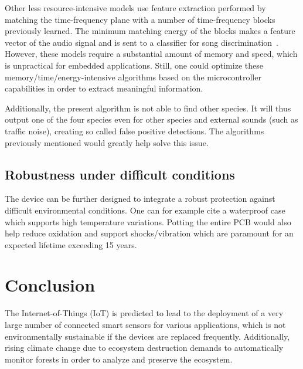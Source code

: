 \documentclass{EPL-master-thesis-covers-EN}
\begin{document}
Other less resource-intensive models use feature extraction performed by matching the time-frequency plane with a number of time-frequency blocks previously learned. The minimum matching energy of the blocks makes a feature vector of the audio signal and is sent to a classifier for song discrimination~\cite{4959924}.
However, these models require a substantial amount of memory and speed, which is unpractical for embedded applications. Still, one could optimize these memory/time/energy-intensive algorithms based on the microcontroller capabilities in order to extract meaningful information.

Additionally, the present algorithm is not able to find other species. It will thus output one of the four species even for other species and external sounds (such as traffic noise), creating so called false positive detections. The algorithms previously mentioned would greatly help solve this issue.

\section{Robustness under difficult conditions}

The device can be further designed to integrate a robust protection against difficult environmental conditions. One can for example cite a waterproof case which supports high temperature variations. Potting the entire PCB would also help reduce oxidation and support shocks/vibration which are paramount for an expected lifetime exceeding 15 years.


\chapter{Conclusion}
\label{chapter:conclusion}

The Internet-of-Things (IoT) is predicted to lead to the deployment of a very large number of connected smart sensors for various applications, which is not environmentally sustainable if the devices are replaced frequently.
Additionally, rising climate change due to ecosystem destruction demands to automatically monitor forests in order to analyze and preserve the ecosystem.
\end{document}

